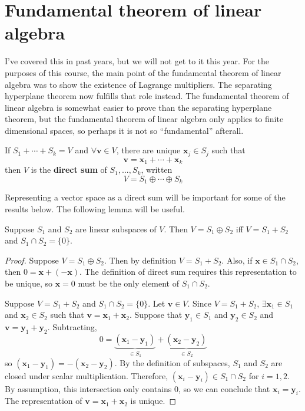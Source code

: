 \section{Fundamental theorem of linear algebra}
I've covered this in past years, but we will not get to it this
year. For the purposes of this course, the main point of the
fundamental theorem of linear algebra was to show the existence of
Lagrange multipliers. The separating hyperplane theorem now fulfills
that role instead. The fundamental theorem of linear algebra is
somewhat easier to prove than the separating hyperplane theorem, but
the fundamental theorem of linear algebra only applies to finite
dimensional spaces, so perhaps it is not so ``fundamental'' afterall. 

\begin{definition}
  If $S_1 + \cdots + S_k = V$ and $\forall \mathbf{v} \in V$, there
  are unique $\mathbf{x}_j \in S_j$ such that 
  \[ \mathbf{v} = \mathbf{x}_1 + \cdots  + \mathbf{x}_k \]
  then $V$ is the \textbf{direct sum} of $S_1, ..., S_k$, written 
  \[ V = S_1 \oplus \cdots \oplus S_k \]
\end{definition}
Representing a vector space as a direct sum will be important for some
of the results below. The following lemma will be useful.
\begin{lemma}\label{lem:dirSum}
  Suppose $S_1$ and $S_2$ are linear subspaces of $V$. Then $V = S_1
  \oplus S_2$ iff $V = S_1 + S_2$ and $S_1 \cap S_2 = \{0\}$. 
\end{lemma}
\begin{proof}
  Suppose $V = S_1 \oplus S_2$. Then by definition $V = S_1 +
  S_2$. Also, if $\mathbf{x} \in S_1 \cap S_2$, then $0 = \mathbf{x} + (-\mathbf{x})$. The
  definition of direct sum requires this representation to be unique,
  so $\mathbf{x} = 0$ must be the only element of $S_1 \cap S_2$.

  Suppose $V = S_1 + S_2$ and $S_1 \cap S_2 = \{0\}$. Let $\mathbf{v} \in
  V$. Since $V = S_1 + S_2$, $\exists \mathbf{x}_1 \in S_1$ and $\mathbf{x}_2 \in S_2$
  such that $\mathbf{v} = \mathbf{x}_1 + \mathbf{x}_2$. Suppose that
  $\mathbf{y}_1 \in S_1$ and $\mathbf{y}_2 \in S_2$ and $\mathbf{v} =
  \mathbf{y}_1 + \mathbf{y}_2$. Subtracting, 
  \[ 0 = \underbrace{(\mathbf{x}_1 - \mathbf{y}_1)}_{\in S_1} + \underbrace{(\mathbf{x}_2 -
    \mathbf{y}_2)}_{\in S_2} \]
  so $(\mathbf{x}_1 - \mathbf{y}_1) = -(\mathbf{x}_2 -
  \mathbf{y}_2)$. By the definition of subspaces, $S_1$ and $S_2$ are
  closed under scalar multiplication. Therefore, $(\mathbf{x}_i -
  \mathbf{y}_i) \in S_1 \cap S_2$ for $i = 1, 2$. By assumption, this
  intersection only contains $0$, so we can conclude that
  $\mathbf{x}_i = \mathbf{y}_i$. The representation of $\mathbf{v} =
  \mathbf{x}_1 + \mathbf{x}_2$ is unique.
\end{proof}

